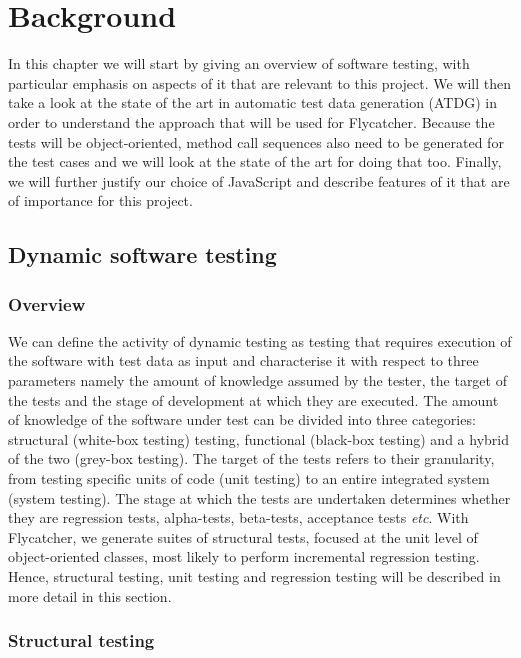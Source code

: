 \chapter{Background}
\label{background}

In this chapter we will start by giving an overview of software testing, with particular emphasis on aspects of it that are relevant to this project. We will then take a look at the state of the art in automatic test data generation (ATDG) in order to understand the approach that will be used for \textsf{Flycatcher}. Because the tests will be object-oriented, method call sequences also need to be generated for the test cases and we will look at the state of the art for doing that too. Finally, we will further justify our choice of JavaScript and describe features of it that are of importance for this project.

\section{Dynamic software testing}

\subsection{Overview}

We can define the activity of dynamic testing as testing that requires execution of the software with test data as input \cite{mahmood2007systematic} and characterise it with respect to three parameters namely the amount of knowledge assumed by the tester, the target of the tests and the stage of development at which they are executed. The amount of knowledge of the software under test can be divided into three categories: structural (white-box testing) testing, functional (black-box testing) and a hybrid of the two (grey-box testing). The target of the tests refers to their granularity, from testing specific units of code (unit testing) to an entire integrated system (system testing). The stage at which the tests are undertaken determines whether they are regression tests, alpha-tests, beta-tests, acceptance tests \emph{etc}. With \textsf{Flycatcher}, we generate suites of structural tests, focused at the unit level of object-oriented classes, most likely to perform incremental regression testing. Hence, structural testing, unit testing and regression testing will be described in more detail in this section.

\subsection{Structural testing}

